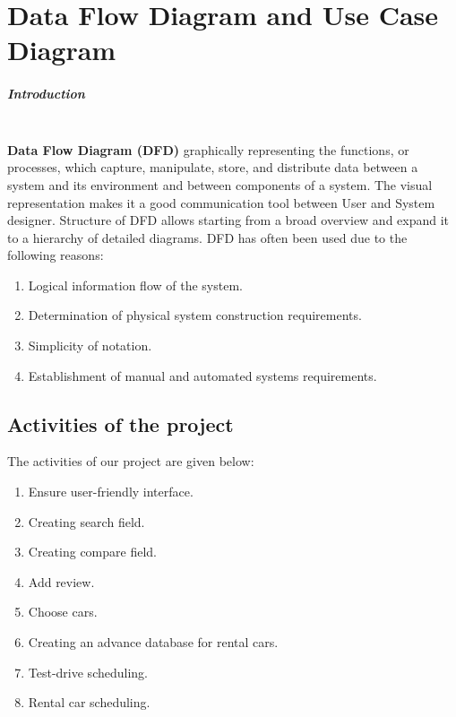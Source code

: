
\chapter{Data Flow Diagram and Use Case Diagram}

\noindent 
\paragraph{\Large{Introduction}}

\noindent\\ \textbf{ Data Flow Diagram (DFD)} graphically representing the functions, or processes, which capture, manipulate, store, and distribute data between a system and its environment and between components of a system. The visual representation makes it a good communication tool between User and System designer. Structure of DFD allows starting from a broad overview and expand it to a hierarchy of detailed diagrams. DFD has often been used due to the following reasons:
\noindent 

\begin{enumerate}
\item  Logical information flow of the system.

\item  Determination of physical system construction requirements.

\item  Simplicity of notation.

\item  Establishment of manual and automated systems requirements.
\end{enumerate}

\noindent 
\section{Activities of the project}

\noindent The activities of our project are given below:

\begin{enumerate}
\item  Ensure user-friendly interface.

\item  Creating search field.

\item  Creating compare field.

\item  Add review.

\item  Choose cars.

\item  Creating an advance database for rental cars.

\item  Test-drive scheduling.

\item  Rental car scheduling.

\end{enumerate}

